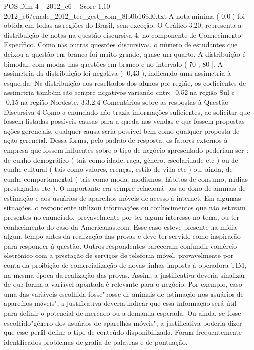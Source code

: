\begin{textsample}{POS Dim 4 – 2012\_c6 – Score 1.00 – 2012\_c6/enade\_2012\_tec\_gest\_com\_8fb0b169d0.txt}
A nota mínima ( 0,0 ) foi obtida em todas as regiões do Brasil, sem exceção.
O Gráfico 3.20, representa a distribuição de notas na questão discursiva 4, no componente de Conhecimento Específico.
Como nas outras questões discursivas, o número de estudantes que deixou a questão em branco foi muito grande, quase um quarto.
A distribuição é bimodal, com modas nas questões em branco e no intervalo ( 70 ; 80 ].
A assimetria da distribuição foi negativa ( -0,43 ), indicando uma assimetria à esquerda.
Na distribuição dos resultados dos alunos por região, os coeficientes de assimetria também são sempre negativos variando entre -0,52 na região Sul e -0,15 na região Nordeste. 3.3.2.4 Comentários sobre as respostas à Questão Discursiva 4 Como o enunciado não trazia informações suficientes, ao solicitar que fossem listadas possíveis causas para a queda nas vendas e que fossem propostas ações gerenciais, qualquer causa seria possível bem como qualquer proposta de ação gerencial.
Dessa forma, pelo padrão de resposta, os fatores externos à empresa que fossem influentes sobre o tipo de negócio apresentado poderiam ser : de cunho demográfico ( tais como idade, raça, gênero, escolaridade etc ) ou de cunho cultural ( tais como valores, crenças, estilo de vida etc ) ou, ainda, de cunho comportamental ( tais como moda, modismos, hábitos de consumo, mídias prestigiadas etc ).
O importante era sempre relacioná -los ao dono de animais de estimação e aos usuários de aparelhos móveis de acesso à internet.
Em algumas situações, o respondente utilizou informações ou conhecimentos que não estavam presentes no enunciado, provavelmente por ter algum interesse no tema, ou ter conhecimento do caso da Americanas.com.
Esse caso esteve presente na mídia algum tempo antes da realização das provas e deve ter servido como inspiração para responder à questão.
Outros respondentes pareceram confundir comércio eletrônico com a prestação de serviços de telefonia móvel, provavelmente por conta da proibição de comercialização de novas linhas imposta à operadora TIM, na mesma época da realização das provas.
Assim, a justificativa deveria sinalizar de que forma a variável apontada é relevante para o negócio.
Por exemplo, caso uma das variáveis escolhida fosse"posse de animais de estimação nos usuários de aparelhos móveis", a justificativa deveria indicar que essa informação será útil para definir o potencial de mercado ou a demanda esperada.
Ou ainda, se fosse escolhido"gênero dos usuários de aparelhos móveis", a justificativa poderia dizer que esse perfil define o tipo de conteúdo disponibilizado.
Foram frequentemente identificados problemas de grafia de palavras e de pontuação.

\end{textsample}
